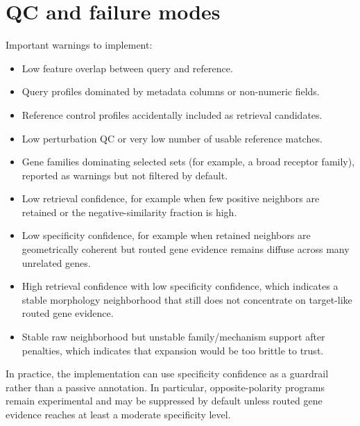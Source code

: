 \documentclass[11pt]{article}
\begin{document}
\section{QC and failure modes}
Important warnings to implement:
\begin{itemize}[leftmargin=2em]
\item Low feature overlap between query and reference.
\item Query profiles dominated by metadata columns or non-numeric fields.
\item Reference control profiles accidentally included as retrieval candidates.
\item Low perturbation QC or very low number of usable reference matches.
\item Gene families dominating selected sets (for example, a broad receptor family), reported as warnings but not filtered by default.
\item Low retrieval confidence, for example when few positive neighbors are retained or the negative-similarity fraction is high.
\item Low specificity confidence, for example when retained neighbors are geometrically coherent but routed gene evidence remains diffuse across many unrelated genes.
\item High retrieval confidence with low specificity confidence, which indicates a stable morphology neighborhood that still does not concentrate on target-like routed gene evidence.
\item Stable raw neighborhood but unstable family/mechanism support after penalties, which indicates that expansion would be too brittle to trust.
\end{itemize}

In practice, the implementation can use specificity confidence as a guardrail rather than a passive annotation. In particular, opposite-polarity programs remain experimental and may be suppressed by default unless routed gene evidence reaches at least a moderate specificity level.
\end{document}
